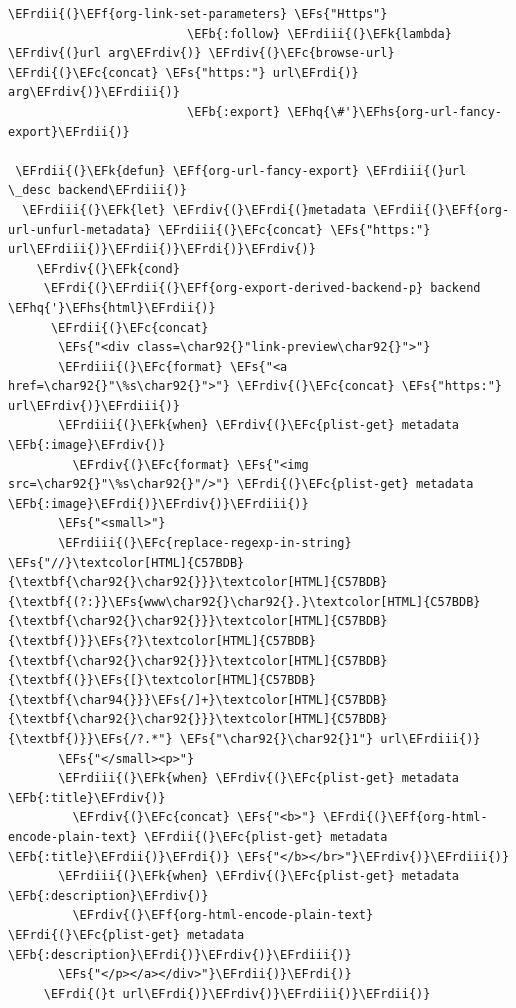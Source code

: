 \documentclass{scrartcl}
\newcommand{\EFk}[1]{\textcolor{EFk}{#1}} %
\newcommand{\EFs}[1]{\textcolor{EFs}{#1}} %
\newcommand{\EFb}[1]{\textcolor{EFb}{#1}} %
\newcommand{\EFc}[1]{\textcolor{EFc}{#1}} %
\newcommand{\EFf}[1]{\textcolor{EFf}{#1}} %
\newcommand{\EFhq}[1]{#1} %
\newcommand{\EFhs}[1]{#1} %
\newcommand{\EFrdi}[1]{#1} %
\newcommand{\EFrdii}[1]{#1} %
\newcommand{\EFrdiii}[1]{#1} %
\newcommand{\EFrdiv}[1]{#1} %
\begin{document}
\begin{Code}
\begin{Verbatim}[]
\EFrdii{(}\EFf{org-link-set-parameters} \EFs{"Https"}
                         \EFb{:follow} \EFrdiii{(}\EFk{lambda} \EFrdiv{(}url arg\EFrdiv{)} \EFrdiv{(}\EFc{browse-url} \EFrdi{(}\EFc{concat} \EFs{"https:"} url\EFrdi{)} arg\EFrdiv{)}\EFrdiii{)}
                         \EFb{:export} \EFhq{\#'}\EFhs{org-url-fancy-export}\EFrdii{)}

 \EFrdii{(}\EFk{defun} \EFf{org-url-fancy-export} \EFrdiii{(}url \_desc backend\EFrdiii{)}
  \EFrdiii{(}\EFk{let} \EFrdiv{(}\EFrdi{(}metadata \EFrdii{(}\EFf{org-url-unfurl-metadata} \EFrdiii{(}\EFc{concat} \EFs{"https:"} url\EFrdiii{)}\EFrdii{)}\EFrdi{)}\EFrdiv{)}
    \EFrdiv{(}\EFk{cond}
     \EFrdi{(}\EFrdii{(}\EFf{org-export-derived-backend-p} backend \EFhq{'}\EFhs{html}\EFrdii{)}
      \EFrdii{(}\EFc{concat}
       \EFs{"<div class=\char92{}"link-preview\char92{}">"}
       \EFrdiii{(}\EFc{format} \EFs{"<a href=\char92{}"\%s\char92{}">"} \EFrdiv{(}\EFc{concat} \EFs{"https:"} url\EFrdiv{)}\EFrdiii{)}
       \EFrdiii{(}\EFk{when} \EFrdiv{(}\EFc{plist-get} metadata \EFb{:image}\EFrdiv{)}
         \EFrdiv{(}\EFc{format} \EFs{"<img src=\char92{}"\%s\char92{}"/>"} \EFrdi{(}\EFc{plist-get} metadata \EFb{:image}\EFrdi{)}\EFrdiv{)}\EFrdiii{)}
       \EFs{"<small>"}
       \EFrdiii{(}\EFc{replace-regexp-in-string} \EFs{"//}\textcolor[HTML]{C57BDB}{\textbf{\char92{}\char92{}}}\textcolor[HTML]{C57BDB}{\textbf{(?:}}\EFs{www\char92{}\char92{}.}\textcolor[HTML]{C57BDB}{\textbf{\char92{}\char92{}}}\textcolor[HTML]{C57BDB}{\textbf{)}}\EFs{?}\textcolor[HTML]{C57BDB}{\textbf{\char92{}\char92{}}}\textcolor[HTML]{C57BDB}{\textbf{(}}\EFs{[}\textcolor[HTML]{C57BDB}{\textbf{\char94{}}}\EFs{/]+}\textcolor[HTML]{C57BDB}{\textbf{\char92{}\char92{}}}\textcolor[HTML]{C57BDB}{\textbf{)}}\EFs{/?.*"} \EFs{"\char92{}\char92{}1"} url\EFrdiii{)}
       \EFs{"</small><p>"}
       \EFrdiii{(}\EFk{when} \EFrdiv{(}\EFc{plist-get} metadata \EFb{:title}\EFrdiv{)}
         \EFrdiv{(}\EFc{concat} \EFs{"<b>"} \EFrdi{(}\EFf{org-html-encode-plain-text} \EFrdii{(}\EFc{plist-get} metadata \EFb{:title}\EFrdii{)}\EFrdi{)} \EFs{"</b></br>"}\EFrdiv{)}\EFrdiii{)}
       \EFrdiii{(}\EFk{when} \EFrdiv{(}\EFc{plist-get} metadata \EFb{:description}\EFrdiv{)}
         \EFrdiv{(}\EFf{org-html-encode-plain-text} \EFrdi{(}\EFc{plist-get} metadata \EFb{:description}\EFrdi{)}\EFrdiv{)}\EFrdiii{)}
       \EFs{"</p></a></div>"}\EFrdii{)}\EFrdi{)}
     \EFrdi{(}t url\EFrdi{)}\EFrdiv{)}\EFrdiii{)}\EFrdii{)}


\end{Verbatim}
\end{Code}
\end{document}
